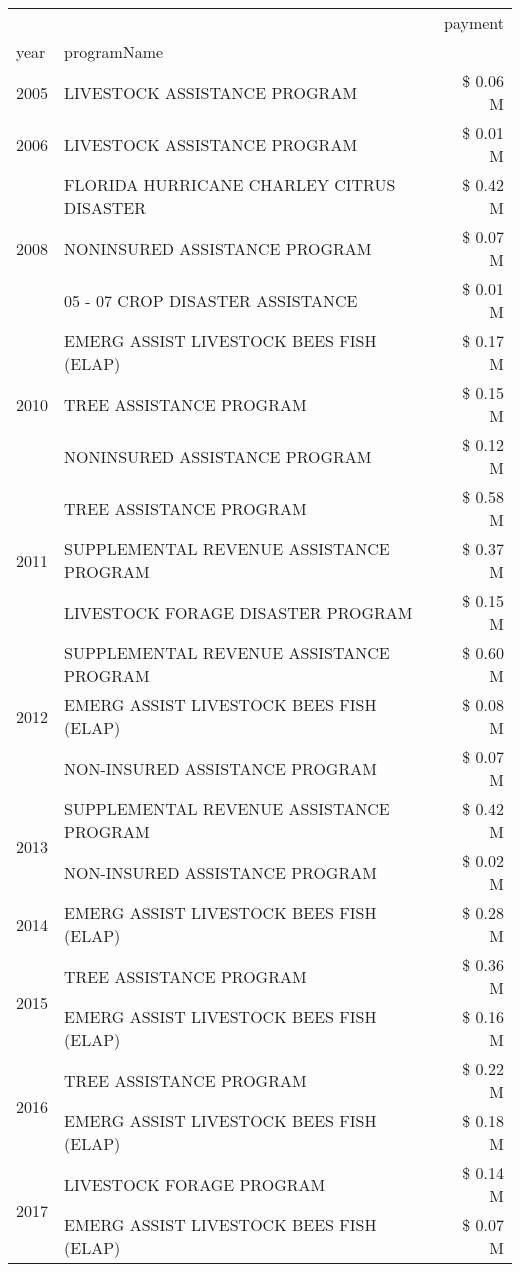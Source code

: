 \begin{tabular}{llr}
\toprule
 &  & payment \\
year & programName &  \\
\midrule
2005 & LIVESTOCK ASSISTANCE PROGRAM & \$ 0.06 M \\
\cline{1-3}
2006 & LIVESTOCK ASSISTANCE PROGRAM & \$ 0.01 M \\
\cline{1-3}
\multirow[t]{3}{*}{2008} & FLORIDA HURRICANE CHARLEY CITRUS DISASTER & \$ 0.42 M \\
 & NONINSURED ASSISTANCE PROGRAM & \$ 0.07 M \\
 & 05 - 07 CROP DISASTER ASSISTANCE & \$ 0.01 M \\
\cline{1-3}
\multirow[t]{3}{*}{2010} & EMERG ASSIST LIVESTOCK BEES FISH (ELAP) & \$ 0.17 M \\
 & TREE ASSISTANCE PROGRAM & \$ 0.15 M \\
 & NONINSURED ASSISTANCE PROGRAM & \$ 0.12 M \\
\cline{1-3}
\multirow[t]{3}{*}{2011} & TREE ASSISTANCE PROGRAM & \$ 0.58 M \\
 & SUPPLEMENTAL REVENUE ASSISTANCE PROGRAM & \$ 0.37 M \\
 & LIVESTOCK FORAGE DISASTER PROGRAM & \$ 0.15 M \\
\cline{1-3}
\multirow[t]{3}{*}{2012} & SUPPLEMENTAL REVENUE ASSISTANCE PROGRAM & \$ 0.60 M \\
 & EMERG ASSIST LIVESTOCK BEES FISH (ELAP) & \$ 0.08 M \\
 & NON-INSURED ASSISTANCE PROGRAM & \$ 0.07 M \\
\cline{1-3}
\multirow[t]{2}{*}{2013} & SUPPLEMENTAL REVENUE ASSISTANCE PROGRAM & \$ 0.42 M \\
 & NON-INSURED ASSISTANCE PROGRAM & \$ 0.02 M \\
\cline{1-3}
2014 & EMERG ASSIST LIVESTOCK BEES FISH (ELAP) & \$ 0.28 M \\
\cline{1-3}
\multirow[t]{2}{*}{2015} & TREE ASSISTANCE PROGRAM & \$ 0.36 M \\
 & EMERG ASSIST LIVESTOCK BEES FISH (ELAP) & \$ 0.16 M \\
\cline{1-3}
\multirow[t]{2}{*}{2016} & TREE ASSISTANCE PROGRAM & \$ 0.22 M \\
 & EMERG ASSIST LIVESTOCK BEES FISH (ELAP) & \$ 0.18 M \\
\cline{1-3}
\multirow[t]{3}{*}{2017} & LIVESTOCK FORAGE PROGRAM & \$ 0.14 M \\
 & EMERG ASSIST LIVESTOCK BEES FISH (ELAP) & \$ 0.07 M \\

\end{tabular}

